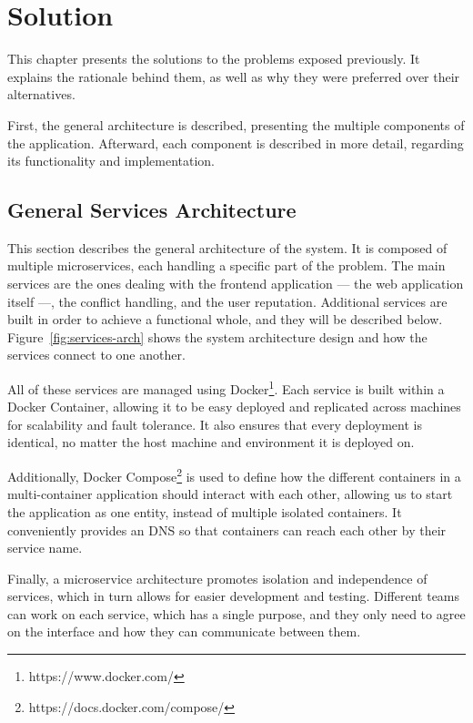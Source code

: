 \chapter{Solution}\label{chap:solution}

This chapter presents the solutions to the problems exposed previously. It explains the rationale behind them, as well as why they were preferred over their alternatives.

First, the general architecture is described, presenting the multiple components of the application. Afterward, each component is described in more detail, regarding its functionality and implementation.

\section{General Services Architecture}

This section describes the general architecture of the system. It is composed of multiple microservices, each handling a specific part of the problem. The main services are the ones dealing with the frontend application --- the web application itself ---, the conflict handling, and the user reputation. Additional services are built in order to achieve a functional whole, and they will be described below. Figure~\ref{fig:services-arch} shows the system architecture design and how the services connect to one another.

All of these services are managed using Docker\footnote{https://www.docker.com/}. Each service is built within a Docker Container, allowing it to be easy deployed and replicated across machines for scalability and fault tolerance. It also ensures that every deployment is identical, no matter the host machine and environment it is deployed on.

Additionally, Docker Compose\footnote{https://docs.docker.com/compose/} is used to define how the different containers in a multi-container application should interact with each other, allowing us to start the application as one entity, instead of multiple isolated containers. It conveniently provides an DNS so that containers can reach each other by their service name.

Finally, a microservice architecture promotes isolation and independence of services, which in turn allows for easier development and testing. Different teams can work on each service, which has a single purpose, and they only need to agree on the interface and how they can communicate between them.

